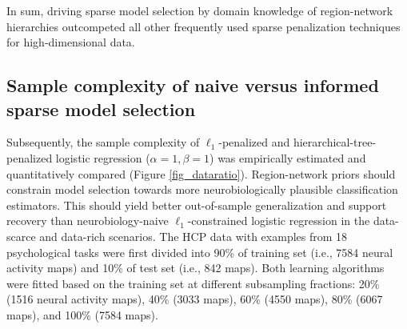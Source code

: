 \documentclass[runningheads,a4paper]{llncs}
\begin{document}
In sum,
driving sparse model selection by domain knowledge of region-network hierarchies
outcompeted all other frequently used sparse penalization techniques
for high-dimensional data.
%
%
\subsection{Sample complexity of naive versus informed sparse model selection}
Subsequently, the sample complexity of
$\ell_1$-penalized and hierarchical-tree-penalized logistic regression
($\alpha = 1, \beta = 1$)
was empirically estimated and quantitatively compared
(Figure \ref{fig_dataratio}).
Region-network priors should constrain model selection towards more
neurobiologically plausible classification estimators.
This should yield better out-of-sample generalization and
support recovery than
neurobiology-naive $\ell_1$-constrained logistic regression
in the data-scarce and data-rich scenarios.
%
The HCP data with examples from 18
psychological tasks were first divided into
90\% of training set (i.e., 7584 neural activity maps) and
10\% of test set (i.e., 842 maps).
Both learning algorithms were fitted based on the
training set at different subsampling fractions:
20\% (1516 neural activity maps),
40\% (3033 maps),
60\% (4550 maps),
80\% (6067 maps), and
100\% (7584 maps).
\end{document}
